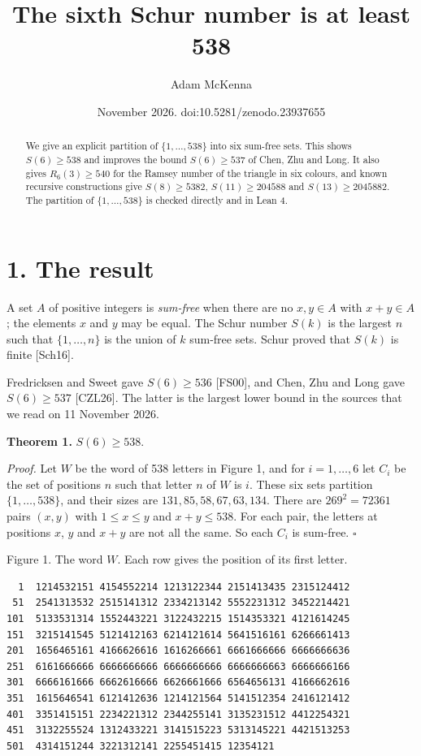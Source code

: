 \documentclass[
]{article}
\title{The sixth Schur number is at least 538}
\author{Adam McKenna}
\date{November 2026. doi:10.5281/zenodo.23937655}
\begin{document}
\maketitle
\begin{abstract}
We give an explicit partition of \(\{1,\dots,538\}\) into six sum-free
sets. This shows \(S(6)\ge 538\) and improves the bound \(S(6)\ge 537\)
of Chen, Zhu and Long. It also gives \(R_6(3)\ge 540\) for the Ramsey
number of the triangle in six colours, and known recursive constructions
give \(S(8)\ge 5382\), \(S(11)\ge 204588\) and \(S(13)\ge 2045882\). The
partition of \(\{1,\dots,538\}\) is checked directly and in Lean 4.
\end{abstract}

\section{1. The result}\label{the-result}

A set \(A\) of positive integers is \emph{sum-free} when there are no
\(x,y\in A\) with \(x+y\in A\); the elements \(x\) and \(y\) may be
equal. The Schur number \(S(k)\) is the largest \(n\) such that
\(\{1,\dots,n\}\) is the union of \(k\) sum-free sets. Schur proved that
\(S(k)\) is finite {[}Sch16{]}.

Fredricksen and Sweet gave \(S(6)\ge 536\) {[}FS00{]}, and Chen, Zhu and
Long gave \(S(6)\ge 537\) {[}CZL26{]}. The latter is the largest lower
bound in the sources that we read on 11 November 2026.

\textbf{Theorem 1.} \(S(6)\ge 538\).

\emph{Proof.} Let \(W\) be the word of 538 letters in Figure 1, and for
\(i=1,\dots,6\) let \(C_i\) be the set of positions \(n\) such that
letter \(n\) of \(W\) is \(i\). These six sets partition
\(\{1,\dots,538\}\), and their sizes are \(131, 85, 58, 67, 63, 134\).
There are \(269^2=72361\) pairs \((x,y)\) with \(1\le x\le y\) and
\(x+y\le 538\). For each pair, the letters at positions \(x\), \(y\) and
\(x+y\) are not all the same. So each \(C_i\) is sum-free. \(\square\)

Figure 1. The word \(W\). Each row gives the position of its first
letter.

\begin{verbatim}
  1  1214532151 4154552214 1213122344 2151413435 2315124412
 51  2541313532 2515141312 2334213142 5552231312 3452214421
101  5133531314 1552443221 3122432215 1514353321 4121614245
151  3215141545 5121412163 6214121614 5641516161 6266661413
201  1656465161 4166626616 1616266661 6661666666 6666666636
251  6161666666 6666666666 6666666666 6666666663 6666666166
301  6666161666 6662616666 6626661666 6564656131 4166662616
351  1615646541 6121412636 1214121564 5141512354 2416121412
401  3351415151 2234221312 2344255141 3135231512 4412254321
451  3132255524 1312433221 3141515223 5313145221 4421513253
501  4314151244 3221312141 2255451415 12354121
\end{verbatim}
\end{document}
